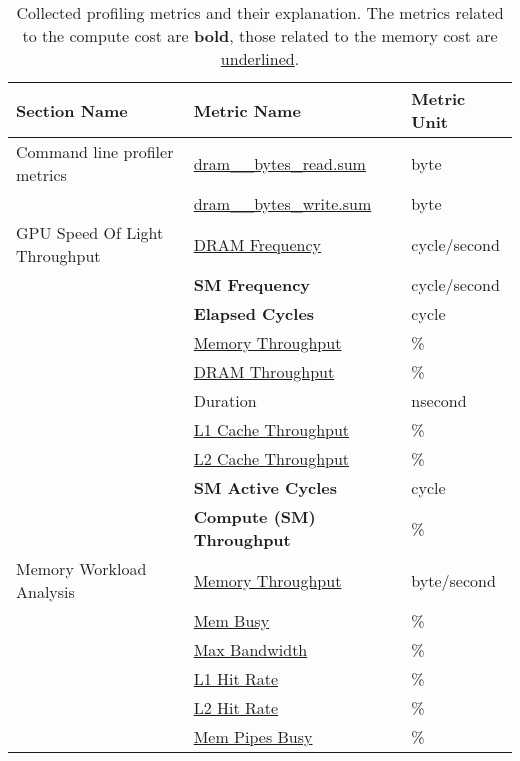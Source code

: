 \begin{table}[t]
  \begin{tabular}{lll}
    \toprule
    Section Name                  & Metric Name                          & Metric Unit  \\
    \midrule\midrule
    Command line profiler metrics & \underline{dram\_\_bytes\_read.sum}  & byte         \\
                                  & \underline{dram\_\_bytes\_write.sum} & byte         \\
    GPU Speed Of Light Throughput & \underline{DRAM Frequency}           & cycle/second \\
                                  & \textbf{SM Frequency}                & cycle/second \\
                                  & \textbf{Elapsed Cycles}              & cycle        \\
                                  & \underline{Memory Throughput}        & \%           \\
                                  & \underline{DRAM Throughput}          & \%           \\
                                  & Duration                             & nsecond      \\
                                  & \underline{L1 Cache Throughput}      & \%           \\
                                  & \underline{L2 Cache Throughput}      & \%           \\
                                  & \textbf{SM Active Cycles}            & cycle        \\
                                  & \textbf{Compute (SM) Throughput}     & \%           \\
    Memory Workload Analysis      & \underline{Memory Throughput}        & byte/second  \\
                                  & \underline{Mem Busy}                 & \%           \\
                                  & \underline{Max Bandwidth}            & \%           \\
                                  & \underline{L1 Hit Rate}              & \%           \\
                                  & \underline{L2 Hit Rate}              & \%           \\
                                  & \underline{Mem Pipes Busy}           & \%           \\
    \bottomrule
  \end{tabular}
  \caption[Collected profiling metrics and their explanation]{Collected profiling metrics and their explanation. The metrics related to the compute cost are \textbf{bold}, those related to the memory cost are \underline{underlined}.}
  \label{tab:4-profiling-metrics}
\end{table}


